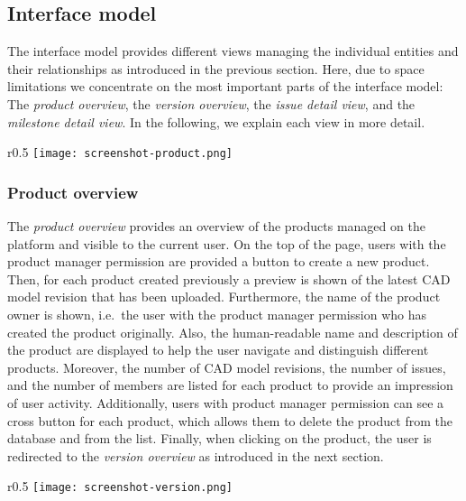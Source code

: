 \subsection{Interface model}

The interface model provides different views managing the individual entities and their relationships as introduced in the previous section.
Here, due to space limitations we concentrate on the most important parts of the interface model: The \textit{product overview}, the \textit{version overview}, the \textit{issue detail view}, and the \textit{milestone detail view}.
In the following, we explain each view in more detail.

\begin{wrapfigure}{r}{0.5\textwidth}
    \centering
    \texttt{[image: screenshot-product.png]}
    \label{fig:screenshot-product}
\end{wrapfigure}

\subsubsection{Product overview}

The \textit{product overview} provides an overview of the products managed on the platform and visible to the current user.
On the top of the page, users with the product manager permission are provided a button to create a new product.
Then, for each product created previously a preview is shown of the latest CAD model revision that has been uploaded.
Furthermore, the name of the product owner is shown, i.e.\ the user with the product manager permission who has created the product originally.
Also, the human-readable name and description of the product are displayed to help the user navigate and distinguish different products.
Moreover, the number of CAD model revisions, the number of issues, and the number of members are listed for each product to provide an impression of user activity.
Additionally, users with product manager permission can see a cross button for each product, which allows them to delete the product from the database and from the list.
Finally, when clicking on the product, the user is redirected to the \textit{version overview} as introduced in the next section.

\begin{wrapfigure}{r}{0.5\textwidth}
    \centering
    \texttt{[image: screenshot-version.png]}
    \label{fig:screenshot-version}
\end{wrapfigure}

